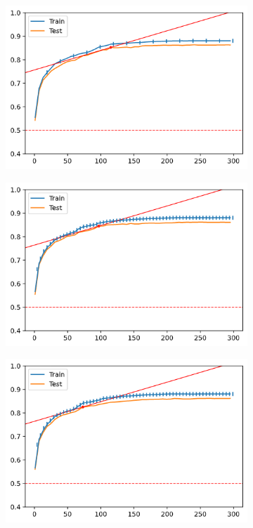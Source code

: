 \begin{figure}[H]
    \centering
    \begin{subfigure}[b]{0.32\linewidth}
        \includegraphics[width=\linewidth]{img/ch5/sampling/300-s20.png}
    \end{subfigure}
    \begin{subfigure}[b]{0.32\linewidth}
        \includegraphics[width=\linewidth]{img/ch5/sampling/300-s5.png}
    \end{subfigure}
    \begin{subfigure}[b]{0.32\linewidth}
        \includegraphics[width=\linewidth]{img/ch5/sampling/300-s5-05v.png}

\end{subfigure}
\end{figure}
